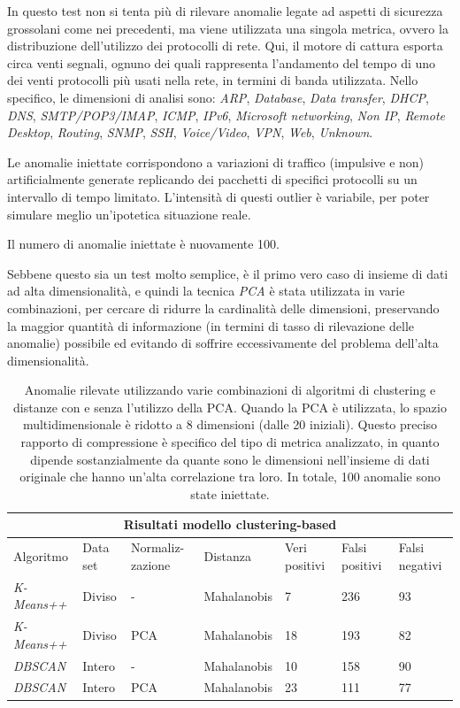 \documentclass[12pt,a4paper,cucitura]{toptesi}
\begin{document}
In questo test non si tenta più di rilevare anomalie legate ad aspetti di sicurezza grossolani come nei precedenti, ma viene utilizzata una singola metrica, ovvero la distribuzione dell'utilizzo dei protocolli di rete.
Qui, il motore di cattura esporta circa venti segnali, ognuno dei quali rappresenta l'andamento del tempo di uno dei venti protocolli più usati nella rete, in termini di banda utilizzata.
Nello specifico, le dimensioni di analisi sono: \emph{ARP}, \emph{Database}, \emph{Data transfer}, \emph{DHCP}, \emph{DNS}, \emph{SMTP/POP3/IMAP}, \emph{ICMP}, \emph{IPv6}, \emph{Microsoft networking}, \emph{Non IP}, \emph{Remote Desktop}, \emph{Routing}, \emph{SNMP}, \emph{SSH}, \emph{Voice/Video}, \emph{VPN}, \emph{Web}, \emph{Unknown}.

Le anomalie iniettate corrispondono a variazioni di traffico (impulsive e non) artificialmente generate replicando dei pacchetti di specifici protocolli su un intervallo di tempo limitato.
L'intensità di questi outlier è variabile, per poter simulare meglio un'ipotetica situazione reale.

Il numero di anomalie iniettate è nuovamente 100.

Sebbene questo sia un test molto semplice, è il primo vero caso di insieme di dati ad alta dimensionalità, e quindi la tecnica \emph{PCA} è stata utilizzata in varie combinazioni, per cercare di ridurre la cardinalità delle dimensioni, preservando la maggior quantità di informazione (in termini di tasso di rilevazione delle anomalie) possibile ed evitando di soffrire eccessivamente del problema dell'alta dimensionalità.

\begin{center}
\begin{table}
\begin{tabular}{l|l|p{1.7cm}|l|p{1.5cm}|p{1.5cm}|p{1.5cm}}
\hline
\hline
\multicolumn{7}{c}{Risultati modello clustering-based} \\
\hline
Algoritmo & Data set & Normaliz- zazione & Distanza & Veri positivi & Falsi positivi & Falsi negativi \\
\hline
\emph{K-Means++} & Diviso & - & Mahalanobis & 7 & 236 & 93 \\
\emph{K-Means++} & Diviso & PCA & Mahalanobis & 18 & 193 & 82 \\
\emph{DBSCAN} & Intero & - & Mahalanobis & 10 & 158 & 90 \\
\emph{DBSCAN} & Intero & PCA & Mahalanobis & 23 & 111 & 77 \\
\hline
\hline
\end{tabular}
\caption[Distribuzione dei protocolli di rete - anomalie rilevate]{Anomalie rilevate utilizzando varie combinazioni di algoritmi di clustering e distanze con e senza l'utilizzo della PCA. Quando la PCA è utilizzata, lo spazio multidimensionale è ridotto a 8 dimensioni (dalle 20 iniziali). Questo preciso rapporto di compressione è specifico del tipo di metrica analizzato, in quanto dipende sostanzialmente da quante sono le dimensioni nell'insieme di dati originale che hanno un'alta correlazione tra loro. In totale, 100 anomalie sono state iniettate.}
\end{table}
\end{center}
\end{document}
